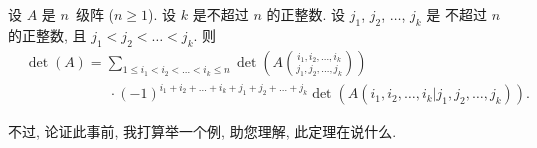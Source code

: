 \documentclass[%
    UTF8,%
    fontset=none,%
    punct=kaiming,%
    zihao=-4,%
    a4paper,%
    oneside,%
]{ctexbook}
\renewcommand*{\leq}{\leqslant}
\renewcommand*{\geq}{\geqslant}
\begin{document}
\begin{theorem}
    设 \(A\) 是 \(n\)~级阵 (\(n \geq 1\)).
    设 \(k\) 是不超过 \(n\) 的正整数.
    设 \(j_1\), \(j_2\), \(\dots\), \(j_k\) 是%
    不超过 \(n\) 的正整数,
    且 \(j_1 < j_2 < \dots < j_k\).
    则
    \begin{align*}
         &
        \det {(A)}
        = \sum_{1 \leq i_1 < i_2 < \dots < i_k \leq n}
        {\det {\left(
                A\binom{i_1, i_2, \dots, i_k}
                {j_1, j_2, \dots, j_k}
                \right)}}
        \\
         &
        \qquad \qquad \qquad
        \cdot (-1)^{i_1 + i_2 + \dots + i_k
            + j_1 + j_2 + \dots + j_k}
        \det {(A({i_1,i_2,\dots,i_k}|{j_1,j_2,\dots,j_k}))}.
    \end{align*}
\end{theorem}

不过, 论证此事前, 我打算举一个例,
助您理解, 此定理在说什么.
\end{document}
